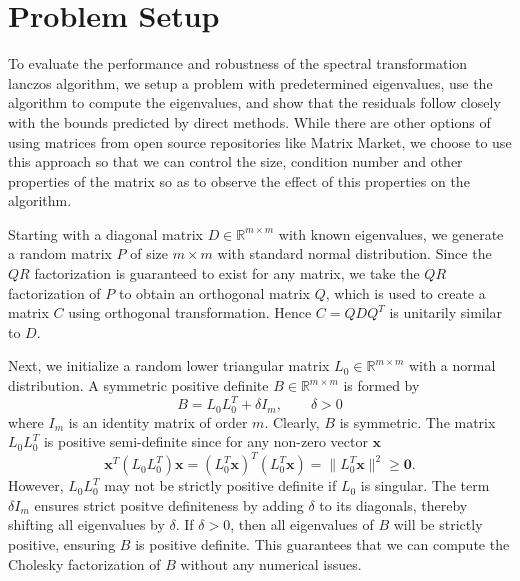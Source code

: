 \section{Problem Setup}\label{sec:ProblemSetup}
To evaluate the performance and robustness of the spectral transformation lanczos algorithm, we setup a problem with predetermined eigenvalues, use the algorithm to compute the eigenvalues, and show that the residuals follow closely with the bounds predicted by direct methods. While there are other options of using matrices from open source repositories like Matrix Market, we choose to use this approach so that we can control the size, condition number and other properties of the matrix so as to observe the effect of this properties on the algorithm.

Starting with a diagonal matrix $D \in \mathbb{R}^{m \times m}$ with known eigenvalues, we generate a random matrix $P$ of size $m \times m $ with standard normal distribution. Since the $QR$ factorization is guaranteed to exist for any matrix, we take the $QR$ factorization of $P$ to obtain an orthogonal matrix $Q$, which is used to create a matrix $C$ using orthogonal transformation. Hence $C = QDQ^T$ is unitarily similar to $D$.

Next, we initialize a random lower triangular matrix $L_0 \in \mathbb{R}^{m \times m}$ with a normal distribution. A symmetric positive definite $B \in \mathbb{R}^{m \times m}$ is formed by
\begin{equation}\label{eq:FormingB}
	B = L_0 L_0^T + \delta I_m, \qquad \delta > 0
\end{equation}
where $I_m$ is an identity matrix of order $m$. Clearly, $B$ is symmetric. The matrix $L_0L_0^T$ is positive semi-definite since for any non-zero vector $\mathbf{x}$
\begin{equation}
	\mathbf{x}^T(L_0L_0^T)\mathbf{x} = (L_0^T\mathbf{x})^T(L_0^T\mathbf{x}) = \| L_0^T\mathbf{x} \|^2 \geq \mathbf{0}.
\end{equation}
However, $L_0L_0^T$ may not be strictly positive definite if $L_0$ is singular. The term $\delta I_m$ ensures strict positve definiteness by adding $\delta$ to its diagonals, thereby shifting all eigenvalues by $\delta$. If $\delta > 0$, then all eigenvalues of $B$ will be strictly positive, ensuring $B$ is positive definite. This guarantees that we can compute the Cholesky factorization of $B$ without any numerical issues.

